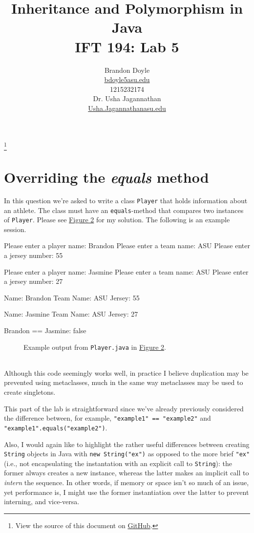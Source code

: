 \documentclass[leqno, 11pt]{article}
\title{\vspace{6ex}Inheritance and Polymorphism in Java\\
  \Large IFT 194: Lab 5}
\author{Brandon Doyle\\
\href{mailto:bdoyle@asu.edu}{bdoyle5\at{}asu.edu}\\
1215232174\\[1em]
Dr. Usha Jagannathan\\
\href{mailto:Usha.Jagannathan@asu.edu}{Usha.Jagannathan\at{}asu.edu}}
\newcommand\blfootnote[1]{%
  \begingroup
    \renewcommand\thefootnote{}\footnote{#1}
    \addtocounter{footnote}{-1}
  \endgroup
}
\newcommand{\iftcodefigure}[3]{%
  \begin{codefigure}
    \label{#1}
    \addtocounter{figure}{-1}
    
  \end{codefigure}
}
\begin{document}
\begin{titlepage}
\clearpage\maketitle
\thispagestyle{empty}
\end{titlepage}
\tableofcontents
\blfootnote{View the source of this document on \href{https://github.com/bjd2385/IFT_194_labs/blob/master/\jobname.tex}{GitHub}.}
\newpage
\section{Overriding the \textit{equals} method}
In this question we're asked to write a class \texttt{Player} that holds information about an athlete. The class must have an \texttt{equals}-method that compares two instances of \texttt{Player}. Please see \hyperref[fig:one]{Figure 2} for my solution. The following is an example session.
\begin{verbbox}[\mbox{}\scriptsize]
Please enter a player name: Brandon
Please enter a team name: ASU
Please enter a jersey number: 55

Please enter a player name: Jasmine
Please enter a team name: ASU
Please enter a jersey number: 27

Name:      Brandon
Team Name: ASU
Jersey:    55

Name:      Jasmine
Team Name: ASU
Jersey:    27

Brandon == Jasmine: false
\end{verbbox}
\begin{figure}[h!]
  \centering
  \theverbbox
  \caption{Example output from \texttt{Player.java} in \hyperref[fig:one]{Figure 2}.}
  \label{fig:three}
\end{figure}
\iftcodefigure{fig:one}{Player.java}{%
  /home/brandon/eclipse-workspace/ift_194_labs/src/lab_5/Player.java}\\
Although this code seemingly works well, in practice I believe duplication may be prevented using metaclasses, much in the same way metaclasses may be used to create singletons.

This part of the lab is straightforward since we've already previously considered the difference between, for example, \texttt{"example1" == "example2"} and \texttt{"example1".equals("example2")}.

Also, I would again like to highlight the rather useful differences between creating \texttt{String} objects in Java with \texttt{new String("ex")} as opposed to the more brief \texttt{"ex"} (i.e., not encapsulating the instantation with an explicit call to \texttt{String}): the former always creates a new instance, whereas the latter makes an implicit call to \textit{intern} the sequence. In other words, if memory or space isn't so much of an issue, yet performance is, I might use the former instantiation over the latter to prevent interning, and vice-versa.
\end{document}
